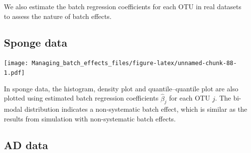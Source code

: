 \documentclass[]{book}
\newenvironment{Shaded}{\begin{snugshade}}{\end{snugshade}}
\newcommand{\KeywordTok}[1]{\textcolor[rgb]{0.13,0.29,0.53}{\textbf{#1}}}
\newcommand{\DataTypeTok}[1]{\textcolor[rgb]{0.13,0.29,0.53}{#1}}
\newcommand{\DecValTok}[1]{\textcolor[rgb]{0.00,0.00,0.81}{#1}}
\newcommand{\StringTok}[1]{\textcolor[rgb]{0.31,0.60,0.02}{#1}}
\newcommand{\ControlFlowTok}[1]{\textcolor[rgb]{0.13,0.29,0.53}{\textbf{#1}}}
\newcommand{\OperatorTok}[1]{\textcolor[rgb]{0.81,0.36,0.00}{\textbf{#1}}}
\newcommand{\NormalTok}[1]{#1}
\begin{document}
We also estimate the batch regression coefficients for each OTU in real
datasets to assess the nature of batch effects.

\subsection{Sponge data}\label{sponge-data}

\begin{Shaded}
\end{Shaded}

\texttt{[image: Managing\_batch\_effects\_files/figure-latex/unnamed-chunk-88-1.pdf]}

In sponge data, the histogram, density plot and quantile--quantile plot
are also plotted using estimated batch regression coefficients
\(\hat{\beta}_{j}\) for each OTU \(j\). The bi-modal distribution
indicates a non-systematic batch effect, which is similar as the results
from simulation with non-systematic batch effects.

\subsection{AD data}\label{ad-data}
\end{document}
